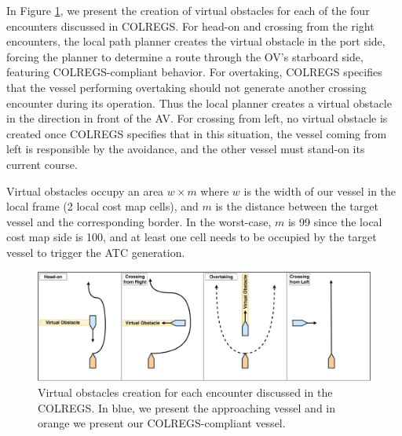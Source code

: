             In Figure \ref{fig:atc}, we present the creation of virtual obstacles for each of the four encounters discussed in \ac{COLREGS}. For head-on and crossing from the right encounters, the local path planner creates the virtual obstacle in the port side, forcing the planner to determine a route through the \ac{OV}'s starboard side, featuring \ac{COLREGS}-compliant behavior. For overtaking, \ac{COLREGS} specifies that the vessel performing overtaking should not generate another crossing encounter during its operation. Thus the local planner creates a virtual obstacle in the direction in front of the \ac{AV}. For crossing from left, no virtual obstacle is created once \ac{COLREGS} specifies that in this situation, the vessel coming from left is responsible by the avoidance, and the other vessel must stand-on its current course.
            
            Virtual obstacles occupy an area $w \times m$ where $w$ is the width of our vessel in the local frame (2 local cost map cells), and $m$ is the distance between the target vessel and the corresponding border. In the worst-case, $m$ is 99 since the local cost map side is 100, and at least one cell needs to be occupied by the target vessel to trigger the \ac{ATC} generation. 
            
            \begin{figure}[H]
                \centering
                \includegraphics[scale=0.32]{figs/Chap4/atc.pdf}
                \caption{Virtual obstacles creation for each encounter discussed in the \ac{COLREGS}. In blue, we present the approaching vessel and in orange we present our \ac{COLREGS}-compliant vessel.
                }
                \label{fig:atc}
            \end{figure}

